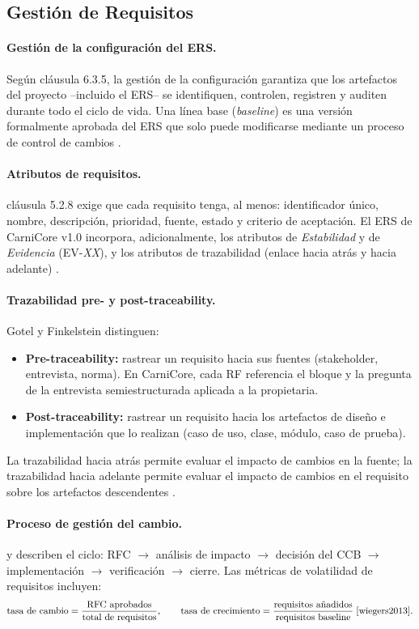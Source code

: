 \documentclass[11pt,a4paper]{article}
\begin{document}
\subsection{Gestión de Requisitos}
\paragraph{Gestión de la configuración del ERS.} Según \cite{iso12207} cláusula 6.3.5, la gestión de la configuración garantiza que los artefactos del
proyecto --incluido el ERS-- se identifiquen, controlen, registren y auditen durante todo
el ciclo de vida. Una línea base (\textit{baseline}) es una versión formalmente aprobada del ERS
que solo puede modificarse mediante un proceso de control de cambios \cite{wiegers2013}.

\paragraph{Atributos de requisitos.} \cite{iso29148} cláusula 5.2.8 exige que cada requisito tenga, al menos: identificador único, nombre,
descripción, prioridad, fuente, estado y criterio de aceptación. El ERS de CarniCore v1.0 incorpora, adicionalmente, los atributos de \textit{Estabilidad} y de \textit{Evidencia} (EV-\textit{XX}), y los atributos de
trazabilidad (enlace hacia atrás y hacia adelante) \cite{gotel1994}.

\paragraph{Trazabilidad pre- y post-traceability.} Gotel y Finkelstein \cite{gotel1994} distinguen:
\begin{itemize}[nosep]
\item \textbf{Pre-traceability:} rastrear un requisito hacia sus fuentes (stakeholder, entrevista, norma). En CarniCore, cada RF referencia el bloque y la pregunta de la entrevista semiestructurada aplicada a la propietaria.
\item \textbf{Post-traceability:} rastrear un requisito hacia los artefactos de diseño e implementación que lo realizan (caso de uso, clase, módulo, caso de prueba).
\end{itemize}
La trazabilidad hacia atrás permite evaluar el impacto de cambios en la fuente; la trazabilidad hacia adelante permite evaluar el impacto de cambios en el requisito sobre los
artefactos descendentes \cite{cleland2012}.

\paragraph{Proceso de gestión del cambio.} \cite{pmbok7} y \cite{iso12207} describen el ciclo: RFC $\rightarrow$ análisis de impacto $\rightarrow$ decisión del CCB $\rightarrow$ implementación $\rightarrow$ verificación $\rightarrow$ cierre. Las métricas de volatilidad de requisitos incluyen:
$$\text{tasa de cambio} = \frac{\text{RFC aprobados}}{\text{total de requisitos}}, \qquad \text{tasa de crecimiento} = \frac{\text{requisitos añadidos}}{\text{requisitos baseline}} \; \cite{wiegers2013}.$$
\end{document}

